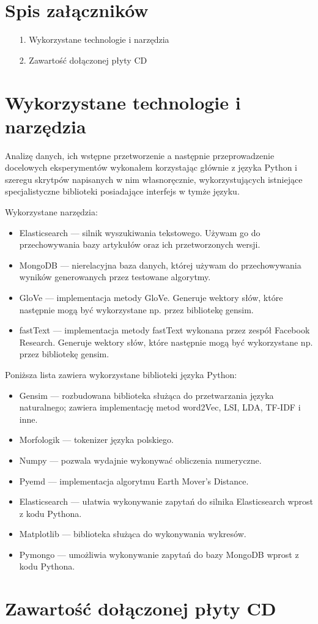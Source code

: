 \documentclass[pl]{minipw} %
\begin{document}
\chapter*{Spis załączników}
\begin{enumerate}
\item[1.] Wykorzystane technologie i narzędzia
\item[2.] Zawartość dołączonej płyty CD
\end{enumerate}

\newpage
\pagestyle{empty}
\appendix
\chapter{Wykorzystane technologie i narzędzia}
Analizę danych, ich wstępne przetworzenie a następnie przeprowadzenie docelowych eksperymentów wykonałem korzystając głównie z języka Python i szeregu skrytpów napisanych w nim własnoręcznie, wykorzystujących istniejące specjalistyczne biblioteki posiadające interfejs w tymże języku.

Wykorzystane narzędzia:
\begin{itemize}
	\item Elasticsearch --- silnik wyszukiwania tekstowego. Używam go do przechowywania bazy artykułów oraz ich przetworzonych wersji.
	\item MongoDB --- nierelacyjna baza danych, której używam do przechowywania wyników generowanych przez testowane algorytmy.
	\item GloVe --- implementacja metody GloVe. Generuje wektory słów, które następnie mogą być wykorzystane np. przez bibliotekę gensim.
	\item fastText --- implementacja metody fastText wykonana przez zespół Facebook Research. Generuje wektory słów, które następnie mogą być wykorzystane np. przez bibliotekę gensim.
\end{itemize}

Poniższa lista zawiera wykorzystane biblioteki języka Python:
\begin{itemize}
	\item Gensim --- rozbudowana biblioteka służąca do przetwarzania języka naturalnego; zawiera implementację metod word2Vec, LSI, LDA, TF-IDF i inne.
	\item Morfologik --- tokenizer języka polskiego.
	\item Numpy --- pozwala wydajnie wykonywać obliczenia numeryczne.
	\item Pyemd --- implementacja algorytmu Earth Mover's Distance.
	\item Elasticsearch --- ułatwia wykonywanie zapytań do silnika Elasticsearch wprost z kodu Pythona.
	\item Matplotlib --- biblioteka służąca do wykonywania wykresów.
	\item Pymongo --- umożliwia wykonywanie zapytań do bazy MongoDB wprost z kodu Pythona.
\end{itemize}

\chapter{Zawartość dołączonej płyty CD}
\end{document}
